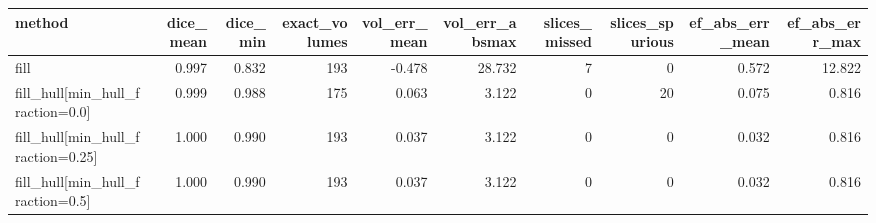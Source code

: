 \begin{tabular}{lrrrrrrrrr}
\toprule
method & dice\_mean & dice\_min & exact\_volumes & vol\_err\_mean & vol\_err\_absmax & slices\_missed & slices\_spurious & ef\_abs\_err\_mean & ef\_abs\_err\_max \\
\midrule
fill & 0.997 & 0.832 & 193 & -0.478 & 28.732 & 7 & 0 & 0.572 & 12.822 \\
fill\_hull[min\_hull\_fraction=0.0] & 0.999 & 0.988 & 175 & 0.063 & 3.122 & 0 & 20 & 0.075 & 0.816 \\
fill\_hull[min\_hull\_fraction=0.25] & 1.000 & 0.990 & 193 & 0.037 & 3.122 & 0 & 0 & 0.032 & 0.816 \\
fill\_hull[min\_hull\_fraction=0.5] & 1.000 & 0.990 & 193 & 0.037 & 3.122 & 0 & 0 & 0.032 & 0.816 \\
\bottomrule
\end{tabular}

